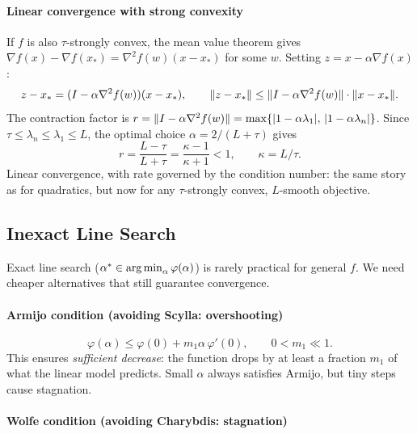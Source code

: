 \paragraph{Linear convergence with strong convexity}

If $f$ is also $\tau$-strongly convex, the mean value theorem gives $\nabla f(x) - \nabla f(x_*) = \nabla^2 f(w)(x - x_*)$ for some $w$.
Setting $z = x - \alpha \nabla f(x)$:
\begin{equation}\label{eq:strong-convex-contraction}
	z - x_* = (I - \alpha \nabla^2 f(w))(x - x_*),
	\qquad
	\lVert z - x_*\rVert \leq \lVert I - \alpha \nabla^2 f(w)\rVert \cdot \lVert x - x_*\rVert.
\end{equation}
The contraction factor is $r = \lVert I - \alpha \nabla^2 f(w)\rVert = \max\{|1 - \alpha\lambda_1|,\, |1 - \alpha\lambda_n|\}$.
Since $\tau \leq \lambda_n \leq \lambda_1 \leq L$, the optimal choice $\alpha = 2/(L + \tau)$ gives
\begin{equation}\label{eq:optimal-fixed-rate}
	r = \frac{L - \tau}{L + \tau} = \frac{\kappa - 1}{\kappa + 1} < 1,
	\qquad \kappa = L / \tau.
\end{equation}
Linear convergence, with rate governed by the condition number: the same story as for quadratics, but now for any $\tau$-strongly convex, $L$-smooth objective.


\subsection{Inexact Line Search}\label{sec:line-search}

Exact line search ($\alpha^* \in \operatorname*{arg\,min}_\alpha \varphi(\alpha)$) is rarely practical for general $f$.
We need cheaper alternatives that still guarantee convergence.

\paragraph{Armijo condition (avoiding Scylla: overshooting)}

\begin{equation}\label{eq:armijo}
	\varphi(\alpha) \leq \varphi(0) + m_1 \alpha\, \varphi'(0),
	\qquad 0 < m_1 \ll 1.
\end{equation}
This ensures \emph{sufficient decrease}: the function drops by at least a fraction $m_1$ of what the linear model predicts.
Small $\alpha$ always satisfies Armijo, but tiny steps cause stagnation.

\paragraph{Wolfe condition (avoiding Charybdis: stagnation)}

